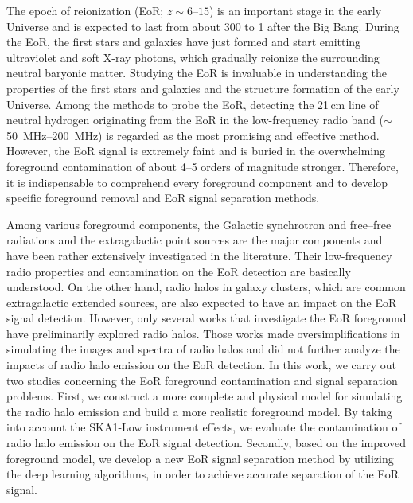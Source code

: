 \begin{englishabstract}

The epoch of reionization (EoR; $z \sim \numrange{6}{15}$) is
an important stage in the early Universe and is expected to last
from about \SI{300}{\Myr} to \SI{1}{\Gyr} after the Big Bang.
During the EoR, the first stars and galaxies have just formed and
start emitting ultraviolet and soft X-ray photons,
which gradually reionize the surrounding neutral baryonic matter.
Studying the EoR is invaluable in understanding the properties of the
first stars and galaxies and the structure formation of the early
Universe.
Among the methods to probe the EoR, detecting the 21\,cm line of
neutral hydrogen originating from the EoR in the low-frequency
radio band ($\sim$\,\SIrange{50}{200}{\MHz}) is regarded as
the most promising and effective method.
However, the EoR signal is extremely faint and is buried in the
overwhelming foreground contamination of about 4--5 orders of magnitude
stronger.
Therefore, it is indispensable to comprehend every foreground
component and to develop specific foreground removal and EoR signal
separation methods.

Among various foreground components, the Galactic synchrotron and
free--free radiations and the extragalactic point sources are the
major components and have been rather extensively investigated in
the literature.
Their low-frequency radio properties and contamination on the EoR
detection are basically understood.
On the other hand, radio halos in galaxy clusters, which are common
extragalactic extended sources, are also expected to have an impact on
the EoR signal detection.
However, only several works that investigate the EoR foreground
have preliminarily explored radio halos.
Those works made oversimplifications in simulating the images and
spectra of radio halos and did not further analyze the impacts of
radio halo emission on the EoR detection.
In this work, we carry out two studies concerning the EoR foreground
contamination and signal separation problems.
First, we construct a more complete and physical model for simulating
the radio halo emission and build a more realistic foreground model.
By taking into account the SKA1-Low instrument effects, we evaluate
the contamination of radio halo emission on the EoR signal detection.
Secondly, based on the improved foreground model, we develop a new EoR
signal separation method by utilizing the deep learning algorithms,
in order to achieve accurate separation of the EoR signal.


\end{englishabstract}
